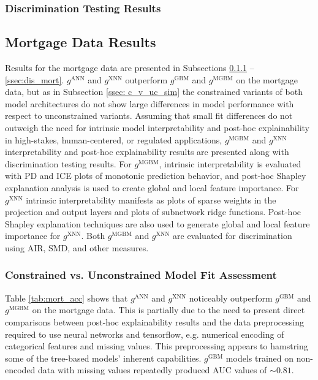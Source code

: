 \documentclass[information,article,submit,moreauthors,pdftex]{definitions/mdpi}
\begin{document}
{\subsubsection{Discrimination Testing Results}\label{ssec:dis_sim}

\subsection{Mortgage Data Results}

Results for the mortgage data are presented in Subsections \ref{ssec:c_v_uc_mort} -- \ref{ssec:dis_mort}.  $g^\text{ANN}$ and $g^\text{XNN}$ outperform $g^\text{GBM}$ and $g^\text{MGBM}$ on the mortgage data, but as in Subsection \ref{ssec: c_v_uc_sim} the constrained variants of both model architectures do not show large differences in model performance with respect to unconstrained variants. Assuming that small fit differences do not outweigh the need for intrinsic model interpretability and post-hoc explainability in high-stakes, human-centered, or regulated applications, $g^\text{MGBM}$ and $g^\text{XNN}$ interpretability and post-hoc explainability results are presented along with discrimination testing results. For $g^\text{MGBM}$, intrinsic interpretability is evaluated with PD and ICE plots of monotonic prediction behavior, and post-hoc Shapley explanation analysis is used to create global and local feature importance. For $g^\text{XNN}$ intrinsic interpretability manifests as plots of sparse weights in the projection and output layers and plots of subnetwork ridge functions. Post-hoc Shapley explanation techniques are also used to generate global and local feature importance for $g^\text{XNN}$. Both $g^\text{MGBM}$ and $g^\text{XNN}$ are evaluated for discrimination using AIR, SMD, and other measures.

\subsubsection{Constrained vs. Unconstrained Model Fit Assessment}\label{ssec:c_v_uc_mort}

Table \ref{tab:mort_acc} shows that $g^\text{ANN}$ and $g^\text{XNN}$ noticeably outperform $g^\text{GBM}$ and $g^\text{MGBM}$ on the mortgage data. This is partially due to the need to present direct comparisons between post-hoc explainability results and the data preprocessing required to use neural networks and tensorflow, e.g. numerical encoding of categorical features and missing values. This preprocessing appears to hamstring some of the tree-based models' inherent capabilities. $g^\text{GBM}$ models trained on non-encoded data with missing values repeatedly produced AUC values of $\sim0.81$. 

}
\end{document}
